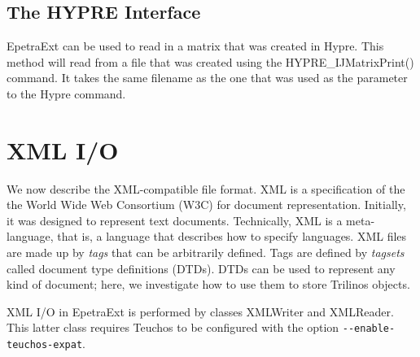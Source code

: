 \documentclass[11pt,relax]{SANDreport}
\begin{document}
\subsection{The HYPRE Interface}
\label{sec:hdf5:hypre}

EpetraExt can be used to read in a matrix that was created in Hypre. This
method will read from a file that was created using the HYPRE\_IJMatrixPrint()
command. It takes the same filename as the one that was used as the parameter
to the Hypre command.

\section{XML I/O}
\label{sec:xml}

We now describe the XML-compatible file format. XML is a specification of the
the World Wide Web Consortium (W3C) for document representation. Initially, it
was designed to represent text documents. Technically, XML is a meta-language,
that is, a language that describes how to specify languages. 
XML files are made up by {\sl tags} that can be arbitrarily defined. Tags are
defined by {\sl tagsets} called document type definitions (DTDs). DTDs can be used
to represent any kind of document; here, we investigate how to use them to
store Trilinos objects.

XML I/O in EpetraExt is performed by classes XMLWriter and XMLReader. This
latter class requires Teuchos to be configured with the option 
\verb!--enable-teuchos-expat!.

\smallskip
\end{document}
